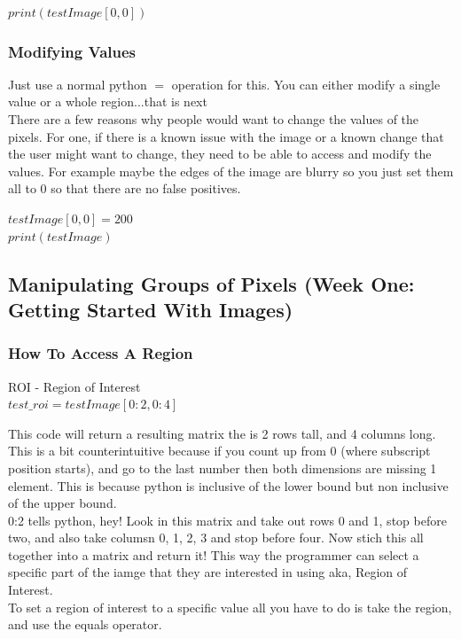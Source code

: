 \documentclass[fleqn]{article}
\begin{document}
    \begin{center}
      $print(testImage[0,0])$
    \end{center}


    \subsubsection{Modifying Values}
    Just use a normal python $=$ operation for this. You can either modify a single value or a whole region...that is next\\
    There are a few reasons why people would want to change the values of the pixels. For one, if there is a known issue with the image or a known change that the user might want to change, they need to be able to access and modify the values. For example maybe the edges of the image are blurry so you just set them all to 0 so that there are no false positives.

    \begin{center}
      $testImage[0,0]=200$\\
      $print(testImage)$
    \end{center}

    \subsection{Manipulating Groups of Pixels (Week One: Getting Started With Images)}
    \subsubsection{How To Access A Region}

    \begin{center}
      ROI - Region of Interest\\
      $test\_roi = testImage[0:2,0:4]$\\
    \end{center}

    This code will return a resulting matrix the is 2 rows tall, and 4 columns long. This is a bit counterintuitive because if you count up from 0 (where subscript position starts), and go to the last number then both dimensions are missing 1 element. This is because python is inclusive of the lower bound but non inclusive of the upper bound. \\
    0:2 tells python, hey! Look in this matrix and take out rows 0 and 1, stop before two, and also take columsn 0, 1, 2, 3 and stop before four. Now stich this all together into a matrix and return it! This way the programmer can select a specific part of the iamge that they are interested in using aka, Region of Interest.\\
    To set a region of interest to a specific value all you have to do is take the region, and use the equals operator.
\end{document}
